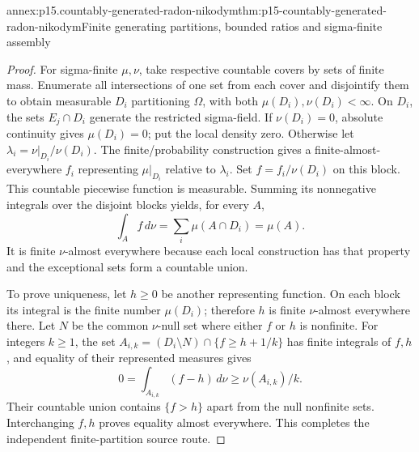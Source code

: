 \begin{annexitem}{annex:p15.countably-generated-radon-nikodym}{thm:p15-countably-generated-radon-nikodym}{Finite generating partitions, bounded ratios and sigma-finite assembly}
\begin{proof}
For sigma-finite \(\mu,\nu\), take respective countable covers by sets
of finite mass. Enumerate all intersections of one set from each cover
and disjointify them to obtain measurable \(D_i\) partitioning \(\Omega\),
with both \(\mu(D_i),\nu(D_i)<\infty\).
On \(D_i\), the sets \(E_j\cap D_i\) generate the restricted sigma-field.
If \(\nu(D_i)=0\), absolute continuity gives \(\mu(D_i)=0\);
put the local density zero.
Otherwise let \(\lambda_i=\nu|_{D_i}/\nu(D_i)\).
The finite/probability construction gives a finite-almost-everywhere
\(f_i\) representing \(\mu|_{D_i}\) relative to \(\lambda_i\).
Set \(f=f_i/\nu(D_i)\) on this block.
This countable piecewise function is measurable. Summing its
nonnegative integrals over the disjoint blocks yields, for every \(A\),
\[
             \int_A f\,d\nu=\sum_i\mu(A\cap D_i)=\mu(A).
\]
It is finite \(\nu\)-almost everywhere because each local construction
has that property and the exceptional sets form a countable union.

To prove uniqueness, let \(h\geq0\) be another representing function.
On each block its integral is the finite number \(\mu(D_i)\);
therefore \(h\) is finite \(\nu\)-almost everywhere there.
Let \(N\) be the common \(\nu\)-null set where either \(f\) or \(h\)
is nonfinite.
For integers \(k\geq1\), the set
\(A_{i,k}=(D_i\setminus N)\cap\{f\geq h+1/k\}\)
has finite integrals of \(f,h\),
and equality of their represented measures gives
\[
          0=\int_{A_{i,k}}(f-h)\,d\nu\geq\nu(A_{i,k})/k.
\]
Their countable union contains \(\{f>h\}\) apart from the null
nonfinite sets. Interchanging \(f,h\) proves equality almost everywhere.
This completes the independent finite-partition source route.
\end{proof}
\end{annexitem}

